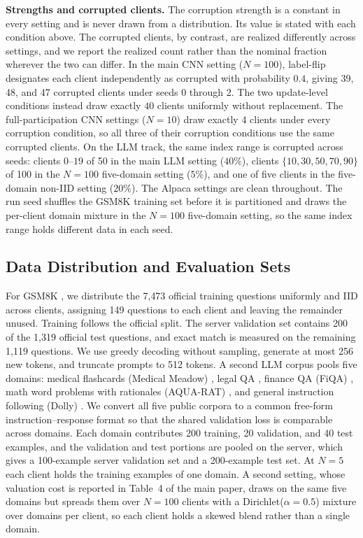 \documentclass[letterpaper]{article} %
\theoremstyle{definition}
\begin{document}
\noindent\textbf{Strengths and corrupted clients.} The corruption strength is a constant
in every setting and is never drawn from a distribution. Its value is stated
with each condition above. The corrupted clients, by contrast, are realized
differently across settings, and we report the realized count rather than the
nominal fraction wherever the two can differ. In the main CNN setting
($N{=}100$), label-flip designates each client independently as corrupted with
probability $0.4$, giving 39, 48, and 47 corrupted clients under
seeds 0 through 2. The two update-level conditions instead draw exactly
$40$ clients uniformly without replacement. The full-participation CNN
settings ($N{=}10$) draw
exactly 4 clients under every corruption condition, so all three of their
corruption conditions use the same corrupted clients. On the LLM track, the same index range is
corrupted across seeds:
clients $0$--$19$ of 50 in the main LLM setting ($40\%$), clients
$\{10, 30, 50, 70, 90\}$ of 100 in the $N{=}100$ five-domain setting ($5\%$),
and one of five clients in the five-domain non-IID setting ($20\%$). The Alpaca
settings are clean throughout. The run seed shuffles the GSM8K training set
before it is partitioned and draws the per-client domain mixture in the
$N{=}100$ five-domain setting, so the same index range holds different data in
each seed.

\subsection{Data Distribution and Evaluation Sets}
\label{app:data}

For GSM8K \citep{cobbe2021training}, we distribute the 7{,}473 official
training questions uniformly and IID across clients, assigning 149 questions
to each client and leaving the remainder unused. Training follows the official
split. The server validation set contains 200 of the 1{,}319 official test
questions, and exact match is measured on the remaining 1{,}119 questions. We
use greedy decoding without sampling, generate at most 256 new tokens, and
truncate prompts to 512 tokens. A second LLM corpus pools five domains: medical
flashcards (Medical Meadow) \citep{han2023medalpaca}, legal QA
\citep{legalqa}, finance QA
(FiQA) \citep{maia201818}, math word problems with rationales (AQUA-RAT)
\citep{ling2017program}, and general instruction following (Dolly)
\citep{conover2023free}. We convert all five
public corpora to a common free-form
instruction--response format so that the shared validation loss is comparable
across domains. Each domain contributes 200 training, 20 validation, and 40 test
examples, and the validation and test portions are pooled on the server, which
gives a 100-example server validation set and a 200-example test set. At
$N{=}5$ each client holds the training examples of one domain. A second setting,
whose valuation cost is reported in Table~4 of the main paper, draws on the same five
domains but spreads them over
$N{=}100$ clients with a Dirichlet($\alpha{=}0.5$) mixture over domains per
client, so each client holds a skewed blend rather than a single domain.
\end{document}
